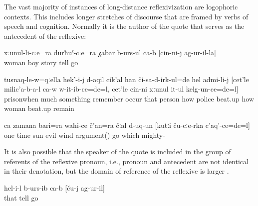 The vast majority of instances of long-distance reflexivization are logophoric contexts. This includes longer stretches of discourse that are framed by verbs of speech and cognition. Normally it is the author of the quote that serves as the antecedent of the reflexive:
%
\begin{exe}

		\ex	\label{ex:He is telling his wife and his son what had happened to him@4a}
		\gll	xːunul-li-cːe=ra	durħuˁ-cːe=ra	χabar	b-urs-ul	ca-b	[cin-ni-j	ag-ur-il-la]\\
			woman	boy	story	tell			go\\
		\glt	{}	

		\ex	\label{ex:When the man was in prison he remembered a lot, how the police beat}
		\gll	tusnaq-le-w=qːella	hek'-i-j	d-aqil	cik'al	han	či-sa-d-irk-ul=de	hel	admi-li-j	[cet'le	milic'a-b-a-l	ca-w	w-it-ib-ce=de=l,	cet'le	cin-ni	xːunul	it-ul	kelg-un-ce=de=l]\\
			prisonwhen		much	something	remember	occur	that	person	how	police		beat.up	how		woman	beat.up	remain\\
		\glt	{}	

	\ex	\label{ex:‎‎Once the sun and the evil wind argued about who is stronger}
	\gll	ca	zamana	bari=ra	wahi-ce	č'an=ra	čːal	d-uq-un	[kutːi	ču-cːe-rka	c'aq'-ce=de=l]\\
		one	time	sun	evil	wind	argument()	go	which		mighty-\\
	\glt	{}
\end{exe}

It is also possible that the speaker of the quote is included in the group of referents of the reflexive pronoun, i.e., pronoun and antecedent are not identical in their denotation, but the domain of reference of the reflexive is larger .
%
\begin{exe}
	\ex	\label{ex:‎‎‎He told what had happened to them}
	\gll	hel-i-l	b-urs-ib	ca-b	[ču-j	ag-ur-il]\\
		that	tell			go\\
	\glt	{}
\end{exe}

